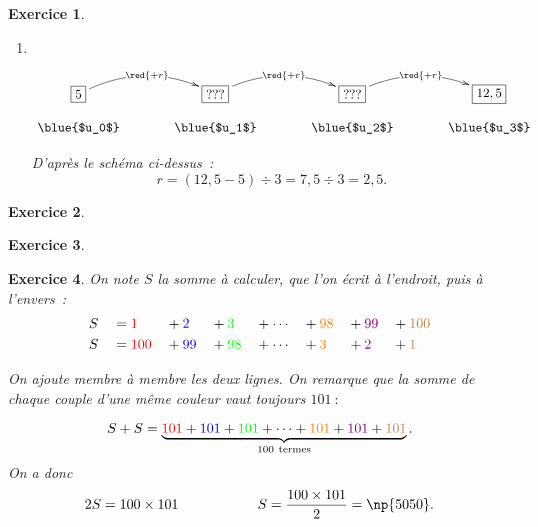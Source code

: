 \documentclass[10pt]{article}
\newtheorem{exo}{Exercice}
\begin{document}
\begin{exo}
\begin{enumerate}
\item ~{}\begin{center}
    $\xymatrix@R=0.5pc@C=3pc{
    *+[F]+{5} \ar@/^0.5cm/[r]|{\red{+r}} & 
    *+[F]+{???} \ar@/^0.5cm/[r]|{\red{+r}} & *+[F]+{???} \ar@/^0.5cm/[r]|{\red{+r}} & 
    *+[F]+{12,5} \\
    \txt{\blue{$u_0$}}&
    \txt{\blue{$u_1$}}&\txt{\blue{$u_2$}}&
    \txt{\blue{$u_3$}}
    }$
    \end{center}
    
    D'après le schéma ci-dessus~:
    \[r=(12,5-5)\div 3=7,5\div 3=2,5.\]
\end{enumerate}

\end{exo}



\begin{exo}

\end{exo}

\begin{exo}

\end{exo}

\begin{exo}

On note $S$ la somme à calculer, que l'on écrit à l'endroit, puis à l'envers~:
\begin{alignat*}{8}
&S&&= \textcolor{red}{1}&&+\textcolor{blue}{2}&&+\textcolor{green}{3}&&+\cdots  &&+\textcolor{orange}{98} &&+ \textcolor{violet}{99}&&+ \textcolor{brown}{100}\\
&S&&= \textcolor{red}{100}&&+\textcolor{blue}{99}&&+\textcolor{green}{98}&&+\cdots &&+\textcolor{orange}{3} &&+ \textcolor{violet}{2}&&+ \textcolor{brown}{1}
\end{alignat*}


On ajoute membre à membre les deux lignes. On remarque que la somme de chaque couple d'une même couleur vaut toujours $101~:$


\[S+S=\underbrace{\textcolor{red}{101}+\textcolor{blue}{101}+\textcolor{green}{101}+\cdots+\textcolor{orange}{101}+\textcolor{violet}{101}+\textcolor{brown}{101}}_{100~\text{termes}}.\]
On a donc
\[2S=100\times 101\hspace{2cm} S=\frac{100\times 101}{2}=\np{5050}.\]
\end{exo}
\end{document}

